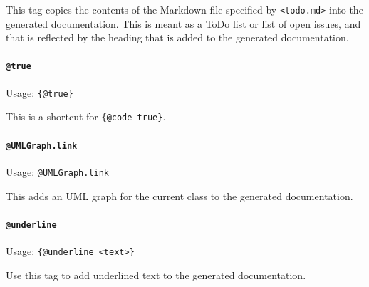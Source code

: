 This tag copies the contents of the Markdown file specified by \texttt{<todo.md>} into the generated documentation. This is meant as a ToDo list or list of open issues, and that is reflected by the heading that is added to the generated documentation.


\paragraph{\lstinline|@true|}\label{sec:TagTRUE}  Usage: \lstinline|{@true}|

This is a shortcut for \lstinline|{@code true}|.


\paragraph{\lstinline|@UMLGraph.link|}\label{sec:TagUMLGraph}  Usage: \lstinline|@UMLGraph.link|

This adds an UML graph for the current class to the generated documentation.


\paragraph{\lstinline|@underline|}\label{sec:TagUnderline}  Usage: \lstinline|{@underline <text>}|

Use this tag to add underlined text to the generated documentation.


